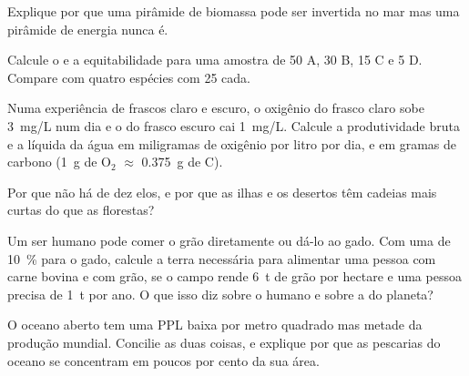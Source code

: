 \begin{exercise}[$\star\star$]\label{exo:b1:ecosystem-organization:6}
Explique por que uma pirâmide de biomassa pode ser invertida no mar
mas uma pirâmide de energia nunca é.
\end{exercise}

\begin{exercise}[$\star\star$]\label{exo:b1:ecosystem-organization:7}
Calcule o  e a equitabilidade para uma amostra de 50
A, 30 B, 15 C e 5 D. Compare com quatro espécies com 25 cada.
\end{exercise}

\begin{exercise}[$\star\star$]\label{exo:b1:ecosystem-organization:8}
Numa experiência de frascos claro e escuro, o oxigênio do frasco claro
sobe \qty{3}{mg/L} num dia e o do frasco escuro cai \qty{1}{mg/L}.
Calcule a produtividade bruta e a líquida da água em miligramas de
oxigênio por litro por dia, e em gramas de carbono (\qty{1}{g} de
$\mathrm{O_2}$ $\approx$ \qty{0.375}{g} de C).
\end{exercise}

\begin{exercise}[$\star\star$]\label{exo:b1:ecosystem-organization:9}
Por que não há  de dez elos, e por que as ilhas e
os desertos têm cadeias mais curtas do que as florestas?
\end{exercise}

\begin{exercise}[$\star\star\star$]\label{exo:b1:ecosystem-organization:10}
Um ser humano pode comer o grão diretamente ou dá-lo ao gado. Com uma
 de \qty{10}{\%} para o gado, calcule a terra
necessária para alimentar uma pessoa com carne bovina e com grão, se o
campo rende \qty{6}{t} de grão por hectare e uma pessoa precisa de
\qty{1}{t} por ano. O que isso diz sobre o  humano e
sobre a  do planeta?
\end{exercise}

\begin{exercise}[$\star\star\star$]\label{exo:b1:ecosystem-organization:11}
O oceano aberto tem uma PPL baixa por metro quadrado mas metade da
produção mundial. Concilie as duas coisas, e explique por que as
pescarias do oceano se concentram em poucos por cento da sua área.
\end{exercise}

